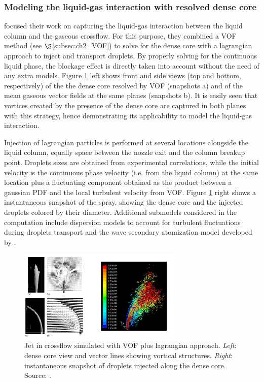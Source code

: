 \subsubsection*{Modeling the liquid-gas interaction with resolved dense core }

 focused their work on capturing the liquid-gas interaction between the liquid column and the gaseous crossflow. For this purpose, they combined a VOF method (see $\S$\ref{subsec:ch2_VOF}) to solve for the dense core with a lagrangian approach to inject and transport droplets. By properly solving for the continuous liquid phase, the blockage effect is directly taken into account without the need of any extra models. Figure \ref{fig:arienti_2006_jicf} left shows front and side views (top and bottom, respectively) of the the dense core resolved by VOF (snapshots a) and of the mean gaseous vector fields at the same planes (snapshots b). It is easily seen that vortices created by the presence of the dense core are captured in both planes with this strategy, hence demonstrating its applicability to model the liquid-gas interaction.

Injection of lagrangian particles is performed at several locations alongside the liquid column, equally space between the nozzle exit and the column breakup point. Droplets sizes are obtained from experimental correlations, while the initial velocity is the continuous phase velocity (i.e. from the liquid column) at the same location plus a fluctuating component obtained as the product between a gaussian PDF and the local turbulent velocity from VOF. Figure \ref{fig:arienti_2006_jicf} right shows a instantaneous snapshot of the spray, showing the dense core and the injected droplets colored by their diameter. Additional submodels considered in the computation include dispersion models to account for turbulent fluctuations during droplets transport  and the wave secondary atomization model developed by .


\begin{figure}[ht]
    \centering
    \includegraphics[width=0.7\textwidth]{./part1_numerical_approaches/figures_ch3/arienti_2006_jicf}
       \centering
    \caption{Jet in crossflow simulated with VOF plus lagrangian approach. \textsl{Left}: dense core view and vector lines showing vortical structures. \textsl{Right}: instantaneous snapshot of droplets injected along the dense core. Source: .}
    \label{fig:arienti_2006_jicf}
\end{figure}


